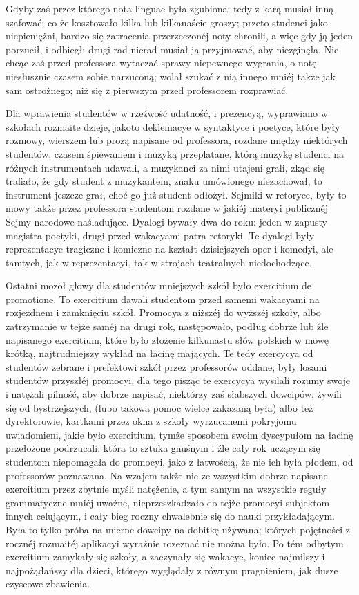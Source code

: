 \documentclass{book}
\begin{document}
Gdyby zaś przez którego nota linguae była zgubiona; tedy z karą musiał inną szafować; co że kosztowało kilka lub kilkanaście groszy; przeto studenci jako niepieniężni, bardzo się zatracenia przerzeczonéj noty chronili, a więc gdy ją jeden porzucił, i odbiegł; drugi rad nierad musiał ją przyjmować, aby niezginęła. Nie chcąc zaś przed professora wytaczać sprawy niepewnego wygrania, o notę niesłusznie czasem sobie narzuconą; wolał szukać z nią innego mniéj także jak sam ostrożnego; niż się z pierwszym przed professorem rozprawiać.

Dla wprawienia studentów w rzeźwość udatność, i prezencyą, wyprawiano w szkołach rozmaite dzieje, jakoto deklemacye w syntaktyce i poetyce, które były rozmowy, wierszem lub prozą napisane od professora, rozdane między niektórych studentów, czasem śpiewaniem i muzyką przeplatane, którą muzykę studenci na różnych instrumentach udawali, a muzykanci za nimi utajeni grali, zkąd się trafiało, że gdy student z muzykantem, znaku umówionego niezachował, to instrument jeszcze grał, choć go już student odłożył. Sejmiki w retoryce, były to mowy także przez professora studentom rozdane w jakiéj materyi publicznéj Sejmy narodowe naśladujące. Dyalogi bywały dwa do roku: jeden w zapusty magistra poetyki, drugi przed wakacyami patra retoryki. Te dyalogi były reprezentacye tragiczne i komiczne na kształt dzisiejszych oper i komedyi, ale tamtych, jak w reprezentacyi, tak w strojach teatralnych niedochodzące.

Ostatni mozoł głowy dla studentów mniejszych szkół było exercitium de promotione. To exercitium dawali studentom przed samemi wakacyami na rozjezdnem i zamknięciu szkół. Promocya z niższéj do wyższéj szkoły, albo zatrzymanie w tejże saméj na drugi rok, następowało, podług dobrze lub źle napisanego exercitium, które było złożenie kilkunastu słów polskich w mowę krótką, najtrudniejszy wykład na łacinę mających. Te tedy exercycya od studentów zebrane i prefektowi szkół przez professorów oddane, były losami studentów przyszłéj promocyi, dla tego pisząc te exercycya wysilali rozumy swoje i natężali pilność, aby dobrze napisać, niektórzy zaś słabszych dowcipów, żywili się od bystrzejszych, (lubo takowa pomoc wielce zakazaną była) albo też dyrektorowie, kartkami przez okna z szkoły wyrzucanemi pokryjomu uwiadomieni, jakie było exercitium, tymże sposobem swoim dyscypułom na łacinę przełożone podrzucali: która to sztuka gnuśnym i źle cały rok uczącym się studentom niepomagała do promocyi, jako z łatwością, że nie ich była płodem, od professorów poznawana. Na wzajem także nie ze wszystkim dobrze napisane exercitium przez zbytnie myśli natężenie, a tym samym na wszystkie reguły grammatyczne mniéj uważne, nieprzeszkadzało do tejże promocyi subjektom innych celującym, i cały bieg roczny chwalebnie się do nauki przykładającym. Była to tylko próba na mierne dowcipy na dobitkę używana; których pojętności z rocznéj rozmaitéj aplikacyi wyraźnie rozeznać nie można było. Po tém odbytym exercitium zamykały się szkoły, a zaczynały się wakacye, koniec najmilszy i najpożądańszy dla dzieci, którego wyglądały z równym pragnieniem, jak dusze czyscowe zbawienia.
\end{document}

